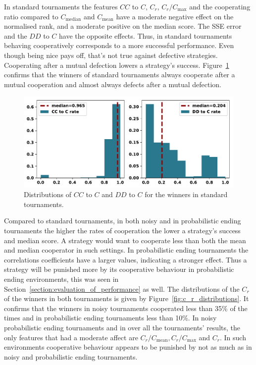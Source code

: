 \documentclass{article}
\begin{document}
In standard tournaments the features  $CC$ to $C$, $C_r$, $C_r / C_{\text{max}}$
and the cooperating ratio compared to $C_{\text{median}}$ and $C_{\text{mean}}$
have a moderate negative effect on the normalised rank, and a moderate positive
on the median score. The SSE error and the $DD$ to $C$ have the opposite
effects. Thus, in standard tournaments behaving cooperatively corresponds to a
more successful performance. Even though being nice pays off,
that's not true against defective strategies. Cooperating after a mutual
defection lowers a strategy's success.
Figure~\ref{fig:rates_of_winners_in_standard_tournaments} confirms that the
winners of standard tournaments always cooperate after a mutual cooperation and
almost always defects after a mutual defection.

\begin{figure}[!htbp]
    \centering
    \includegraphics[width=.65\textwidth]{../images/rates_of_winners_in_standard_tournaments.pdf}
    \caption{Distributions of $CC$ to $C$ and $DD$ to $C$ for the winners in
    standard tournaments.}\label{fig:rates_of_winners_in_standard_tournaments}
\end{figure}

Compared to standard tournaments, in both noisy and in probabilistic ending
tournaments the higher the rates of cooperation the lower a strategy's success
and median score. A strategy would want to cooperate less than both
the mean and median cooperator in such settings. In probabilistic ending
tournaments the correlations coefficients have a larger values, indicating a
stronger effect. Thus a strategy will be punished more by its cooperative
behaviour in probabilistic ending environments, this was seen in Section~\ref{section:evaluation_of_performance}
as well. The distributions of the $C_r$ of the winners in
both tournaments is given by Figure~\ref{fig:c_r_distributions}. It confirms
that the winners in noisy tournaments cooperated less than 35\% of the times
and in probabilistic ending tournaments less than 10\%.
In noisy probabilistic ending tournaments and in over all the tournaments' results,
the only features that had a moderate affect are $C_r/C_{\text{mean}},
C_r/C_{\text{max}}$ and $C_r$. In such environments cooperative behaviour
appears to be punished by not as much as in noisy and probabilistic ending
tournaments.
\end{document}
